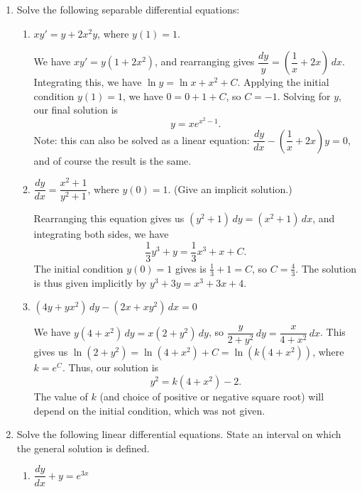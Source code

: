 \documentclass[12pt]{article}
\begin{document}
\thispagestyle{fancy}

\begin{enumerate}
 \item Solve the following separable differential equations:
\begin{enumerate}
 \item $xy' = y+2x^2y$, where $y(1)=1$.
 
 \bigskip
 
 We have $xy' = y(1+2x^2)$, and rearranging gives $\dfrac{dy}{y}=\left(\dfrac{1}{x}+2x\right)\,dx$. Integrating this, we have $\ln y = \ln x+x^2+C$. Applying the initial condition $y(1)=1$, we have $0=0+1+C$, so $C=-1$. Solving for $y$, our final solution is
 \[
 y = xe^{x^2-1}.
 \]
Note: this can also be solved as a linear equation: $\dfrac{dy}{dx} - \left(\dfrac{1}{x}+2x\right)y=0$, and of course the result is the same.
 
 \item $\dfrac{dy}{dx} = \dfrac{x^2+1}{y^2+1}$, where $y(0)=1$. (Give an implicit solution.)
 
 \bigskip
 
 Rearranging this equation gives us $(y^2+1)\,dy = (x^2+1)\,dx$, and integrating both sides, we have
 \[
 \frac{1}{3}y^3+y = \frac{1}{3}x^3+x+C.
 \]
 The initial condition $y(0)=1$ gives is $\frac{1}{3}+1 = C$, so $C=\frac{4}{3}$. The solution is thus given implicitly by $y^3+3y=x^3+3x+4$.
 

 
 
 \item $(4y+yx^2)\,dy - (2x+xy^2)\,dx = 0$

 \bigskip
 
 We have $y(4+x^2)\,dy=x(2+y^2)\,dy$, so $\dfrac{y}{2+y^2}\,dy = \dfrac{x}{4+x^2}\,dx$. This gives us $\ln (2+y^2) = \ln(4+x^2)+C = \ln(k(4+x^2))$, where $k=e^C$. Thus, our solution is 
 \[
 y^2=k(4+x^2)-2.
 \]
 The value of $k$ (and choice of positive or negative square root) will depend on the initial condition, which was not given.
 
\end{enumerate}
 \item Solve the following linear differential equations. State an interval on which the general solution is defined.
\begin{enumerate}
 \item $\dfrac{dy}{dx}+y=e^{3x}$
 

\end{enumerate}
\end{enumerate}
\end{document}
